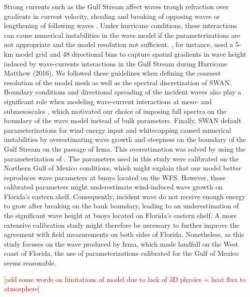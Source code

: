 \documentclass[preprint,12pt,authoryear]{elsarticle}
\begin{document}
Strong currents such as the Gulf Stream affect waves trough refraction over gradients in current velocity, shoaling and breaking of opposing waves or lengthening of following waves \citep{hegermiller2019wave}. Under hurricane conditions, these interactions can cause numerical instabilities in the wave model if the parameterizations are not appropriate and the model resolution not sufficient. \cite{hegermiller2019wave}, for instance, used a 5-km model grid and 48 directional bins to capture spatial gradients in wave height induced by wave-currents interactions in the Gulf Stream during Hurricane Matthew (2016). We followed these guidelines when defining the coarsest resolution of the model mesh as well as the spectral discretization of SWAN. Boundary conditions and directional spreading of the incident waves also play a significant role when modeling wave-current interactions at meso- and submesoscales \citep{villas2020wave}, which motivated our choice of imposing full spectra on the boundary of the wave model instead of bulk parameters. Finally, SWAN default parameterizations for wind energy input and whitecapping caused numerical instabilities by overestimating wave growth and steepness on the boundary of the Gulf Stream on the passage of Irma. This overestimation was solved by using the parameterization of \cite{siadatmousavi2011evaluation}. The parameters used in this study were calibrated on the Northern Gulf of Mexico conditions, which might explain that our model better reproduces wave parameters at buoys located on the WFS. However, these calibrated parameters might underestimate wind-induced wave growth on Florida's eastern shelf. Consequently, incident wave do not receive enough energy to grow after breaking on the bank boundary, leading to an underestimation of the significant wave height at buoys located on Florida's eastern shelf. A more extensive calibration study might therefore be necessary to further improve the agreement with field measurements on both sides of Florida. Nonetheless, as this study focuses on the wave produced by Irma, which made landfall on the West coast of Florida, the use of parameterizations calibrated for the Gulf of Mexico seems reasonable.

\textcolor{red}{[add some words on limitations of model due to lack of 3D physics + heat flux to atmosphere]}
\end{document}

